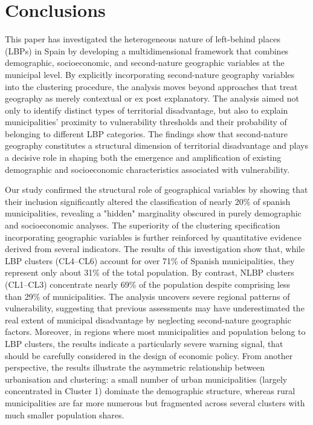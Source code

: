 \documentclass[a4paper,11pt,oneside]{article}
\begin{document}
\section{Conclusions}
\label{sec:conclusions}

This paper has investigated the heterogeneous nature of left-behind places (LBPs) in Spain by developing a multidimensional framework that combines demographic, socioeconomic, and second-nature geographic variables at the municipal level. By explicitly incorporating second-nature geography variables into the clustering procedure, the analysis moves beyond approaches that treat geography as merely contextual or ex post explanatory. The analysis aimed not only to identify distinct types of territorial disadvantage, but also to explain municipalities’ proximity to vulnerability thresholds and their probability of belonging to different LBP categories. The findings show that second-nature geography constitutes a structural dimension of territorial disadvantage and plays a decisive role in shaping both the emergence and amplification of existing demographic and socioeconomic characteristics associated with vulnerability.

Our study confirmed the structural role of geographical variables by showing that their
inclusion significantly altered the classification of nearly 20\% of spanish municipalities, revealing
a "hidden" marginality obscured in purely demographic and socioeconomic analyses. The superiority of the clustering specification incorporating geographic variables is further reinforced by quantitative evidence derived from several indicators. The results of this investigation show that, while LBP clusters (CL4–CL6) account for over 71\% of Spanish municipalities, they represent only about 31\% of the total population. By contrast, NLBP clusters (CL1–CL3) concentrate nearly 69\% of the population despite comprising less than 29\% of municipalities. The analysis uncovers severe regional patterns of vulnerability, suggesting that previous assessments may have underestimated the real extent of municipal disadvantage by neglecting second-nature geographic factors. Moreover, in regions where most municipalities and population belong to LBP clusters, the results indicate  a particularly severe warning signal, that should be carefully considered in the design of economic policy. From another perspective, the results illustrate the asymmetric relationship between urbanisation and clustering: a small number of urban municipalities (largely concentrated in Cluster 1) dominate the demographic structure, whereas rural municipalities are far more numerous but fragmented across several clusters with much smaller population shares.
\end{document}
